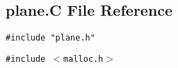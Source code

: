 \subsection{plane.C File Reference}
\label{plane.C}
{\tt \#include "plane.h"}\par
{\tt \#include $<$malloc.h$>$}\par
